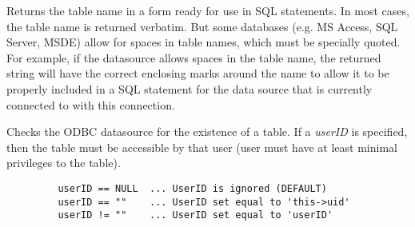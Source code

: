 

\label{wxdbsqltablename}


Returns the table name in a form ready for use in SQL statements.
In most cases, the table name is returned verbatim.  But some databases
(e.g. MS Access, SQL Server, MSDE) allow for spaces in table names, which
must be specially quoted.  For example, if the datasource allows spaces
in the table name, the returned string will have the correct enclosing
marks around the name to allow it to be properly included in a SQL statement
for the data source that is currently connected to with this connection.





\label{wxdbtableexists}


Checks the ODBC datasource for the existence of a table.  If a {\it userID}
is specified, then the table must be accessible by that user (user must have
at least minimal privileges to the table).



\begin{verbatim}
         userID == NULL  ... UserID is ignored (DEFAULT)
         userID == ""    ... UserID set equal to 'this->uid'
         userID != ""    ... UserID set equal to 'userID'
\end{verbatim}

